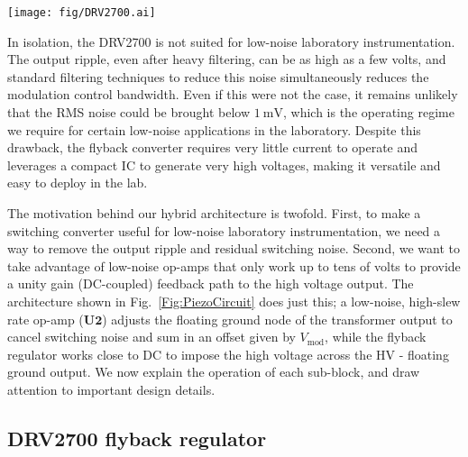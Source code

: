 \documentclass[aip,rsi,reprint]{revtex4-1} %
\begin{document}
\begin{figure*}[t]
\texttt{[image: fig/DRV2700.ai]}
\caption{Schematic of the high voltage stabilization.
The voltage HV is generated using a Texas Instruments DRV2700 high voltage driver in flyback configuration (see Fig.~\ref{Fig:DRV2700}).
A fast, very high slew-rate op-amp senses the output voltage across $R_1$ and $R_2$, and servos it by modulating the node at ``HV floating gnd''.
The $V_{\text{DC}}$ gain is set by $\left(1+R_1/R_2\right)$, while the modulation gain is set by $-R_{\text{mod}}/R_{\text{fb}}$.
The capacitor linking the floating ground node to the output allows the op-amp to remove residual switching noise and stabilize the DC output according to the transfer function given in Eq.~(\ref{Eq:PiezoTransfer}). \label{Fig:PiezoCircuit}}
\end{figure*}

In isolation, the DRV2700 is not suited for low-noise laboratory instrumentation. 
The output ripple, even after heavy filtering, can be as high as a few volts, and standard filtering techniques to reduce this noise simultaneously reduces the modulation control bandwidth.
Even if this were not the case, it remains unlikely that the RMS noise could be brought below $\SI{1}{\milli\volt}$, which is the operating regime we require for certain low-noise applications in the laboratory.
Despite this drawback, the flyback converter requires very little current to operate and leverages a compact IC to generate very high voltages, making it versatile and easy to deploy in the lab.

The motivation behind our hybrid architecture is twofold.
First, to make a switching converter useful for low-noise laboratory instrumentation, we need a way to remove the output ripple and residual switching noise.
Second, we want to take advantage of low-noise op-amps that only work up to tens of volts to provide a unity gain (DC-coupled) feedback path to the high voltage output.
The architecture shown in Fig.~\ref{Fig:PiezoCircuit} does just this; a low-noise, high-slew rate op-amp ($\mathbf{U2}$) adjusts the floating ground node of the transformer output to cancel switching noise and sum in an offset given by $V_{\text{mod}}$, while the flyback regulator works close to DC to impose the high voltage across the HV - floating ground output.
We now explain the operation of each sub-block, and draw attention to important design details.

\subsection{DRV2700 flyback regulator}
\label{Sec:DRV2700}
\end{document}
